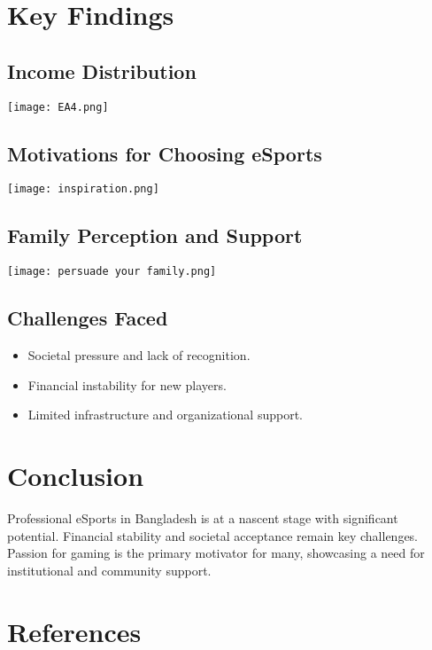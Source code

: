 \documentclass[a1paper,landscape]{a0poster}
\begin{document}
\begin{multicols}{3}
\section*{Key Findings}
\subsection*{Income Distribution}
\texttt{[image: EA4.png]}

\subsection*{Motivations for Choosing eSports}
\texttt{[image: inspiration.png]}

\subsection*{Family Perception and Support}
\texttt{[image: persuade your family.png]}

\subsection*{Challenges Faced}
\begin{itemize}
    \item Societal pressure and lack of recognition.
    \item Financial instability for new players.
    \item Limited infrastructure and organizational support.
\end{itemize}

\section*{Conclusion}
Professional eSports in Bangladesh is at a nascent stage with significant potential. Financial stability and societal acceptance remain key challenges. Passion for gaming is the primary motivator for many, showcasing a need for institutional and community support.

\section*{References}



\end{multicols}
\end{document}
